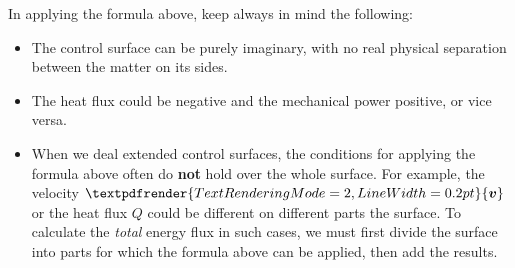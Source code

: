 \documentclass[a4paper,12pt,%
onecolumn,oneside,%
british%
]{memoir}
\renewcommand*{\bm}[1]{\textpdfrender{TextRenderingMode=2,LineWidth=0.2pt}{\boldsymbol{#1}}}
\renewcommand*{\|}[1][]{\nonscript\:#1\vert\nonscript\:\mathopen{}}
\newcommand*{\yv}{\bm{v}}
\newcommand*{\yQ}{Q}%
\begin{document}
\begin{warning}[Tricky points in applying the energy-flux formula,label={warn:energyflux}]
In applying the formula above, keep always in mind the following:
\begin{itemize}
\item The control surface can be purely imaginary, with no real physical separation between the matter on its sides.

\item The heat flux could be negative and the mechanical power positive, or vice versa.

\item When we deal extended control surfaces, the conditions for applying the formula above often do \textbf{not} hold over the whole surface. For example, the velocity $\yv$ or the heat flux $\yQ$ could be different on different parts the surface. To calculate the \emph{total} energy flux in such cases, we must first divide the surface into parts for which the formula above can be applied, then add the results.
\end{itemize}
\end{warning}
\end{document}
